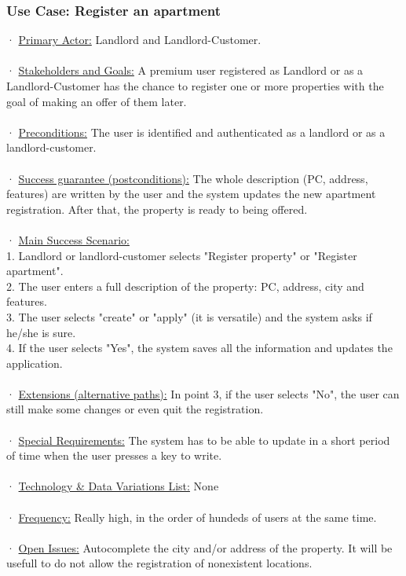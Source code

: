 \documentclass[12pt]{article}
\begin{document}
{\subsubsection{Use Case: Register an apartment}
· \underline{Primary Actor:} Landlord and Landlord-Customer.\\\\
· \underline{Stakeholders and Goals:} A premium user registered as Landlord or as a Landlord-Customer has the chance to register one or more properties with the goal of making an offer of them later.\\\\
· \underline{Preconditions:} The user is identified and authenticated as a landlord or as a landlord-customer.\\\\
· \underline{Success guarantee (postconditions):} The whole description (PC, address, features) are written by the user and the system updates the new apartment registration. After that, the property is ready to being offered.\\\\
· \underline{Main Success Scenario:}\\
	1. Landlord or landlord-customer selects "Register property" or "Register apartment".\\
	2. The user enters a full description of the property: PC, address, city and features.\\
	3. The user selects "create" or "apply" (it is versatile) and the system asks if he/she is sure.\\
	4. If the user selects "Yes", the system saves all the information and updates the application.\\\\
· \underline{Extensions (alternative paths):} In point 3, if the user selects "No", the user can still make some changes or even quit the registration.\\\\
· \underline{Special Requirements:} The system has to be able to update in a short period of time when the user presses a key to write. \\\\
· \underline{Technology \& Data Variations List:} None\\\\
· \underline{Frequency:} Really high, in the order of hundeds of users at the same time.\\\\
· \underline{Open Issues:} Autocomplete the city and/or address of the property. It will be usefull to do not allow the registration of nonexistent locations.\\

}
\end{document}
